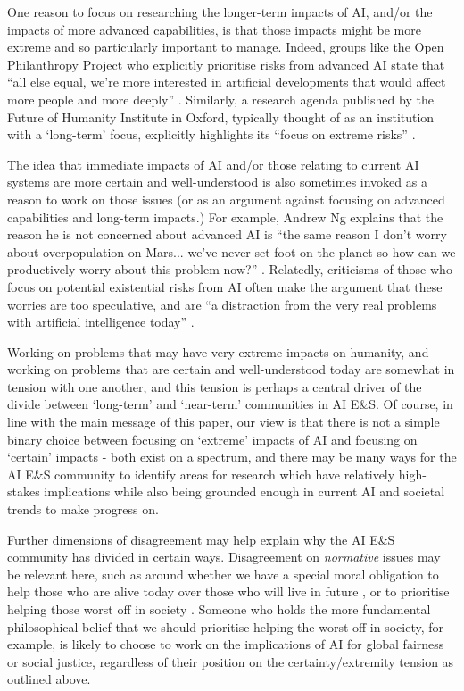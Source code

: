 \documentclass[sigconf]{acmart}
\begin{document}
One reason to focus on researching the longer-term impacts of AI, and/or the impacts of more advanced capabilities, is that those impacts might be more extreme and so particularly important to manage. Indeed, groups like the Open Philanthropy Project who explicitly prioritise risks from advanced AI state that ``all else equal, we're more interested in artificial developments that would affect more people and more deeply'' \cite{karnofsky_potential_2016}. Similarly, a research agenda published by the Future of Humanity Institute in Oxford, typically thought of as an institution with a `long-term' focus, explicitly highlights its ``focus on extreme risks'' \cite{dafoe_ai_2018}.

The idea that immediate impacts of AI and/or those relating to current AI systems are more certain and well-understood is also sometimes invoked as a reason to work on those issues (or as an argument against focusing on advanced capabilities and long-term impacts.) For example, Andrew Ng explains that the reason he is not concerned about advanced AI is ``the same reason I don't worry about overpopulation on Mars... we've never set foot on the planet so how can we productively worry about this problem now?'' \cite{garling_why_2015}. Relatedly, criticisms of those who focus on potential existential risks from AI often make the argument that these worries are too speculative, and are ``a distraction from the very real problems with artificial intelligence today'' \cite{crawford_artificial_2016}.

Working on problems that may have very extreme impacts on humanity, and working on problems that are certain and well-understood today are somewhat in tension with one another, and this tension is perhaps a central driver of the divide between `long-term' and `near-term' communities in AI E\&S. Of course, in line with the main message of this paper, our view is that there is not a simple binary choice between focusing on `extreme' impacts of AI and focusing on `certain' impacts - both exist on a spectrum, and there may be many ways for the AI E\&S community to identify areas for research which have relatively high-stakes implications while also being grounded enough in current AI and societal trends to make progress on. 

Further dimensions of disagreement may help explain why the AI E\&S community has divided in certain ways. Disagreement on \textit{normative} issues may be relevant here, such as around whether we have a special moral obligation to help those who are alive today over those who will live in future \cite{parfit_future_2017}, or to prioritise helping those worst off in society \cite{parfit_equality_1991}. Someone who holds the more fundamental philosophical belief that we should prioritise helping the worst off in society, for example, is likely to choose to work on the implications of AI for global fairness or social justice, regardless of their position on the certainty/extremity tension as outlined above. 
\end{document}
